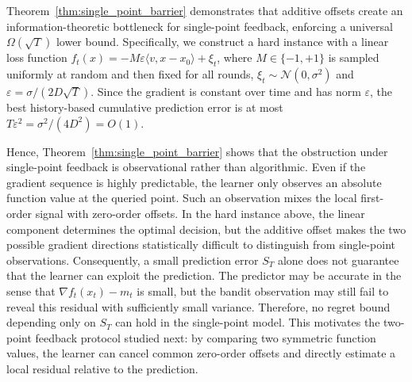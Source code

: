 \documentclass[journal,onecolumn]{IEEEtran}
\theoremstyle{plain}
\theoremstyle{definition}
\theoremstyle{remark}
\begin{document}
Theorem~\ref{thm:single_point_barrier} demonstrates that  additive offsets
create an information-theoretic bottleneck for single-point feedback, enforcing a
universal $\Omega(\sqrt{T})$ lower bound. Specifically, we construct a hard instance with a linear loss function $f_t(x) = -M \varepsilon \langle v, x - x_0 \rangle + \xi_t$, where $M\in \{-1,+1\}$ is sampled uniformly at random  and then  fixed for all rounds, $\xi_t \sim \mathcal{N}(0, \sigma^2)$ and $\varepsilon=\sigma/(2D\sqrt{T})$. Since the gradient is constant over time and has norm $\varepsilon$, the
best history-based cumulative prediction error is at most $T\varepsilon^2=\sigma^2/(4D^2)=O(1)$. %


Hence, Theorem~\ref{thm:single_point_barrier} shows that the obstruction under
single-point feedback is observational rather than algorithmic. Even if the
gradient sequence is highly predictable, the learner only observes an absolute
function value at the queried point. Such an observation mixes the local
first-order signal with zero-order offsets. In the hard instance above, the
linear component determines the optimal decision, but the additive offset makes
the two possible gradient directions statistically difficult to distinguish from
single-point observations. Consequently, a small prediction error $S_T$ alone does not guarantee that the
learner can exploit the prediction. The predictor may be accurate in the sense
that $\nabla f_t(x_t)-m_t$ is small, but the bandit observation may still fail to
reveal this residual with sufficiently small variance. Therefore, no regret
bound depending only on $S_T$ can hold in the single-point model. This motivates
the two-point feedback protocol studied next: by comparing two symmetric
function values, the learner can cancel common zero-order offsets and directly
estimate a local residual relative to the prediction.

\end{document}
